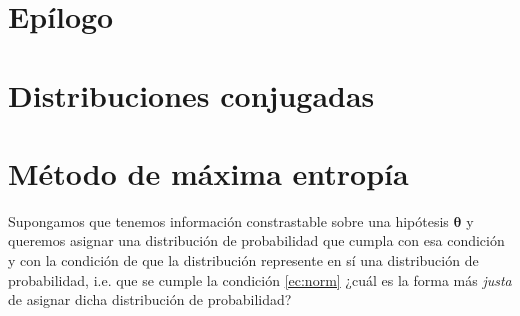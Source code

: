\documentclass[a4paper,twoside]{article}
\newcommand{\hip}{\ensuremath{\bm{\theta}}\xspace}
\begin{document}

\section{Epílogo}

\appendix

\section{Distribuciones conjugadas}\label{sc:conjugate-pdf}


\section{Método de máxima entropía}\label{sc:me-method}

Supongamos que tenemos información constrastable sobre una hipótesis $\hip$ y queremos asignar una
distribución de probabilidad que cumpla con esa condición y con la condición de que la distribución
represente en sí una distribución de probabilidad, i.e. que se cumple la condición \eqref{ec:norm}
¿cuál es la forma más \emph{justa} de asignar dicha distribución de probabilidad?
\end{document}
